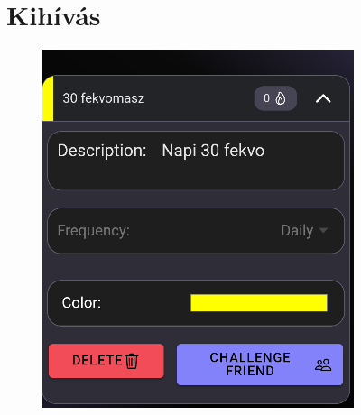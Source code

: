 \documentclass[12pt]{report}
\begin{document}
\section{Kihívás}
\begin{figure}[H]
    \centering

    \begin{minipage}[b]{0.25\textwidth}
        \includegraphics[width=\linewidth]{src/habitkinyilt.png}
    \end{minipage}
    \hfill
    \begin{minipage}[b]{0.25\textwidth}

\end{minipage}
\end{figure}
\end{document}
